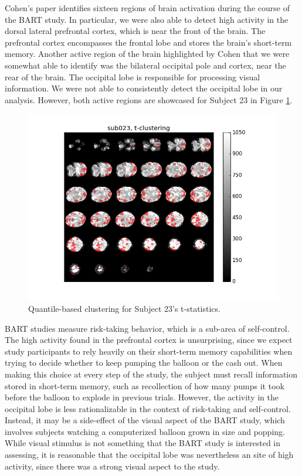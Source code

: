 \par \indent Cohen's paper identifies sixteen regions of brain activation 
during the course of the BART study. In particular, we were also able to detect 
high activity in the dorsal lateral prefrontal cortex, which is near the front 
of the brain. The prefrontal cortex encompasses the frontal lobe and stores 
the brain's short-term memory. Another active region of the brain highlighted 
by Cohen that we were somewhat able to identify was the bilateral occipital 
pole and cortex, near the rear of the brain. The occipital lobe is responsible 
for processing visual information. We were not able to consistently detect
the occipital lobe in our analysis. However, both active regions are showcased 
for Subject 23 in Figure \ref{fig:clustersub23}.

\begin{figure}[ht]
\centering
	\includegraphics[width=.8\linewidth]{../images/sub023_t_overlay.png} 
	\caption{Quantile-based clustering for Subject 23's t-statistics.}
	\label{fig:clustersub23}
\end{figure}

\par BART studies measure risk-taking behavior, which is a sub-area of 
self-control. The high activity found in the prefrontal cortex is 
unsurprising, since we expect study participants to rely heavily on their 
short-term memory capabilities when trying to decide whether to keep pumping 
the balloon or the cash out. When making this choice at every step of the 
study, the subject must recall information stored in short-term memory, such 
as recollection of how many pumps it took before the balloon to explode in 
previous trials. However, the activity in the occipital lobe is less 
rationalizable in the context of risk-taking and self-control. Instead, it may 
be a side-effect of the visual aspect of the BART study, which involves 
subjects watching a computerized balloon grown in size and popping. While 
visual stimulus is not something that the BART study is interested in 
assessing, it is reasonable that the occipital lobe was nevertheless an site 
of high activity, since there was a strong visual aspect to the study. 

